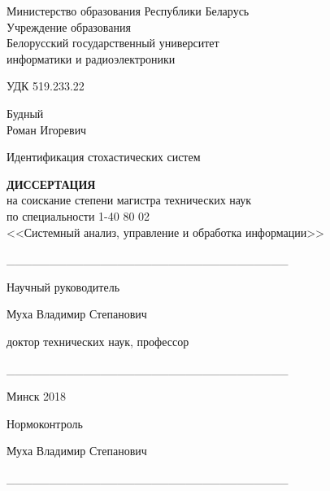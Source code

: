 \setlength{\parindent}{0mm}   %
\hypersetup{pageanchor=false} %
{\centering
  Министерство образования Республики Беларусь \\
  Учреждение образования \\
  Белорусский государственный университет \\
  информатики и радиоэлектроники \\
}

\vspace{2\baselineskip}
УДК 519.233.22

\vspace{\baselineskip}
{\centering
  Будный \\ Роман Игоревич

  \vspace{5\baselineskip}
  Идентификация стохастических систем

  \bigskip
  \textbf{ДИССЕРТАЦИЯ} \\
  на соискание степени магистра технических наук \\
  по специальности 1-40 80 02 \\
  <<Системный анализ, управление и обработка информации>> \\
}

\vspace{2\baselineskip}
\begin{minipage}{.45\linewidth}
\end{minipage}
\hfill
\begin{minipage}{.5\linewidth}
  \_\_\_\_\_\_\_\_\_\_\_\_\_\_\_\_\_\_\_\_\_\_\_\_\_\_\_\_\_\_\_\_\_

  \vspace{1.5\baselineskip}
  Научный руководитель

  \smallskip
  Муха Владимир Степанович

  \smallskip
  доктор технических наук, профессор

  \bigskip
  \_\_\_\_\_\_\_\_\_\_\_\_\_\_\_\_\_\_\_\_\_\_\_\_\_\_\_\_\_\_\_\_\_
\end{minipage}

\vfill
{\centering Минск 2018 \\}
\thispagestyle{empty}
\pagebreak

\vspace*{18cm}
Нормоконтроль

\smallskip
Муха Владимир Степанович

\bigskip
\_\_\_\_\_\_\_\_\_\_\_\_\_\_\_\_\_\_\_\_\_\_\_\_\_\_\_\_\_\_\_\_\_

\thispagestyle{empty}
\pagebreak
\setlength{\parindent}{1.25cm} %
\hypersetup{pageanchor=true}  %